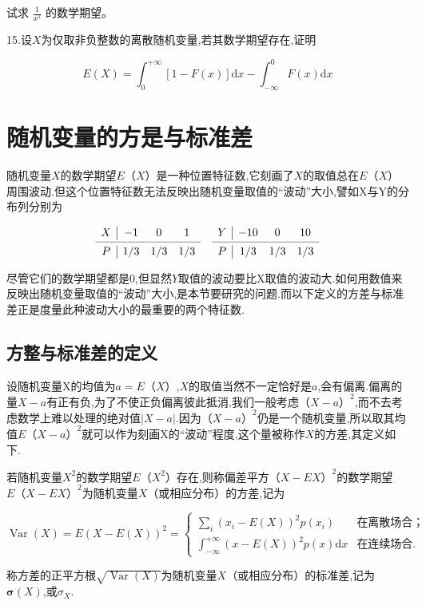 试求 $\frac{1}{x^{2}}$ 的数学期望。

15.设$ X $为仅取非负整数的离散随机变量,若其数学期望存在,证明

\[
E(X)=\int_{0}^{+\infty}[1-F(x)] \mathrm{d} x-\int_{-\infty}^{0} F(x) \mathrm{d} x
\]

\section{随机变量的方是与标准差}


随机变量$ X $的数学期望$ E（X） $是一种位置特征数,它刻画了$ X $的取值总在$ E（X $）周围波动.但这个位置特征数无法反映出随机变量取值的“波动”大小,譬如X与Y的分布列分别为

\[
\begin{array}{c|ccccc|ccc}
X     & -1    & 0     & 1     &       & Y     & -10   & 0     & 10 \\
\cmidrule{1-4}\cmidrule{6-9}    P     & 1/3   & 1/3   & 1/3   &       & P     & 1/3   & 1/3   & 1/3 \\
\end{array}\]

尽管它们的数学期望都是0,但显然$ Y $取值的波动要比X取值的波动大.如何用数值来反映出随机变量取值的“波动”大小,是本节要研究的问题.而以下定义的方差与标准差正是度量此种波动大小的最重要的两个特征数.

\subsection{方整与标准差的定义}

设随机变量X的均值为$ a=E（X） $,$ X $的取值当然不一定恰好是$ a $,会有偏离.偏离的量$ X-a $有正有负,为了不使正负偏离彼此抵消,我们一般考虑$ （X-a）^2 $,而不去考虑数学上难以处理的绝对值$ |X-a| $.因为$ （X-a）^2 $仍是一个随机变量,所以取其均值$ E（X-a）^2 $就可以作为刻画X的“波动”程度,这个量被称作$ X $的方差,其定义如下.
\begin{definition}
	若随机变量$ X^2 $的数学期望$ E（X^2） $存在,则称偏差平方$ （X-EX）^2 $的数学期望$ E（X-EX）^2 $为随机变量$ X $（或相应分布）的方差,记为
	
	\begin{equation}
	\operatorname{Var}(X)=E(X-E(X))^{2}=\left\{\begin{array}{ll}
	{\sum_{i}\left(x_{i}-E(X)\right)^{2} p\left(x_{i}\right)} &{\text{在离散场合；}}\\
	{\int_{-\infty}^{+\infty}(x-E(X))^{2} p(x) \mathrm{d} x} &{\text{在连续场合.}}
	\end{array}\right. \label{eq:2.3.1}
	\end{equation}
	
	称方差的正平方根$\sqrt{\operatorname{Var}(X)}$为随机变量$ X $（或相应分布）的标准差,记为$\boldsymbol{\sigma}(X)$,或$\sigma_X$.
\end{definition}




